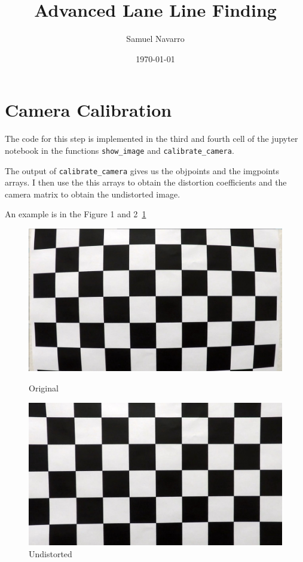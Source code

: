 \documentclass[11pt, a4paper]{article}
\title{Advanced Lane Line Finding}
\author{Samuel Navarro}
\date{\today}
\begin{document}
\maketitle

\tableofcontents{}



\section{Camera Calibration}
\label{sec:camera_calibration}

The code for this step is implemented in the third and fourth cell of the jupyter notebook in the functions \texttt{show\_image} and \texttt{calibrate\_camera}. 

The output of \texttt{calibrate\_camera} gives us the objpoints and the imgpoints arrays. I then use the this arrays to obtain the distortion coefficients and the camera matrix to obtain the undistorted image. 

An example is in the Figure 1 and 2~\ref{fig:undistort} 


\begin{figure}[htb!]
    \centering
    \begin{minipage}{0.5\textwidth}
        \centering
		\includegraphics[width=1\textwidth]{chess_img} 
        \caption{Original}
		\label{fig:original_chess}
    \end{minipage}\hfill
    \begin{minipage}{0.5\textwidth}
        \centering
		\includegraphics[width=1\textwidth]{undistorted_chess} 
        \caption{Undistorted}
		\label{fig:undistorted_chess}
    \end{minipage}
	\label{fig:undistort}
\end{figure}
\end{document}
